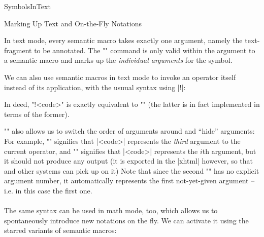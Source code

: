 \begin{smodule}{SymbolsInText}
\begin{sfragment}{Marking Up Text and On-the-Fly Notations}
    \begin{function}{\arg}
        In text mode, every semantic macro takes exactly one
        argument, namely the text-fragment to be annotated.
        The \stexcode"\arg" command is only valid within the
        argument to a semantic macro and marks up the 
        \emph{individual arguments} for the symbol.
    \end{function}

    We can also use semantic macros in text mode to invoke
    an operator itself instead of its application, with the
    usuual syntax using |!|:

    In deed, \stexcode"\symbolname!{<code>}" is exactly equivalent to
    \stexcode"" (the latter is in fact
    implemented in terms of the former).

    \stexcode"\arg" also allows us to switch the order of arguments
    around and ``hide'' arguments: For example, \stexcode""
    signifies that |<code>| represents the \emph{third}
    argument to the current operator, and \stexcode""
    signifies that |<code>| represents the $i$th argument, but it
    should not produce any output (it is exported in the |xhtml|
    however, so that \mmt and other systems can pick up on it)
    Note that since the second \stexcode"\arg" has no explicit argument
    number, it automatically represents the first not-yet-given
    argument -- i.e. in this case the first one.

    \paragraph{} The same syntax can be used in math mode, too,
    which allows us to spontaneously introduce new notations on the
    fly. We can activate it using the starred variants of semantic macros:


\end{sfragment}


\end{smodule}